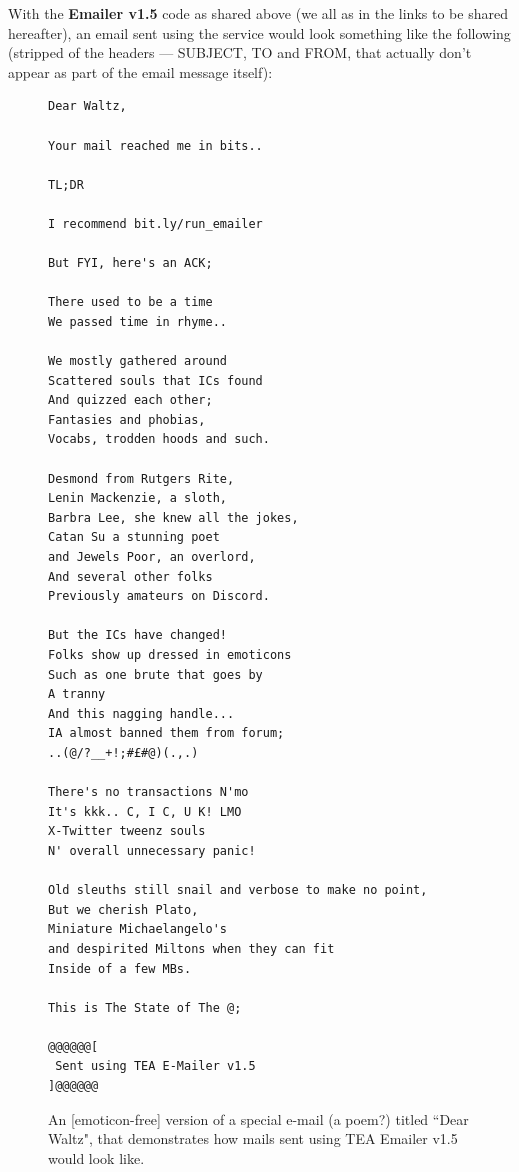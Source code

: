 \documentclass[a4paper, 18pt]{book} %
\begin{document}
{{{\vspace{2em}

With the \textbf{Emailer v1.5} code as shared above (we all as in the links to be shared hereafter), an email sent using the service would look something like the following (stripped of the headers --- SUBJECT, TO and FROM, that actually don't appear as part of the email message itself):


\vspace{2em}

   \begin{figure}[H]
  \centering
  \begin{tcolorbox}[myterminalstyle, title=Sample OUTPUT from EMAILER v1.5]
  \begin{verbatim}
Dear Waltz,

Your mail reached me in bits..

TL;DR 

I recommend bit.ly/run_emailer

But FYI, here's an ACK;

There used to be a time
We passed time in rhyme..

We mostly gathered around
Scattered souls that ICs found
And quizzed each other;
Fantasies and phobias,
Vocabs, trodden hoods and such. 

Desmond from Rutgers Rite,
Lenin Mackenzie, a sloth,
Barbra Lee, she knew all the jokes,
Catan Su a stunning poet
and Jewels Poor, an overlord,
And several other folks
Previously amateurs on Discord.

But the ICs have changed!
Folks show up dressed in emoticons
Such as one brute that goes by 
A tranny 
And this nagging handle...
IA almost banned them from forum;
..(@/?__+!;#£#@)(.,.)

There's no transactions N'mo
It's kkk.. C, I C, U K! LMO
X-Twitter tweenz souls 
N' overall unnecessary panic!

Old sleuths still snail and verbose to make no point,
But we cherish Plato,
Miniature Michaelangelo's
and despirited Miltons when they can fit
Inside of a few MBs.

This is The State of The @;

@@@@@@[
 Sent using TEA E-Mailer v1.5
]@@@@@@
  \end{verbatim}
  \end{tcolorbox}
  \caption{An [emoticon-free] version of a special e-mail (a poem?) titled ``Dear Waltz", that demonstrates how mails sent using TEA Emailer v1.5 would look like.}
  \label{FIGWEXAv15}
\end{figure}

}}}
\end{document}
